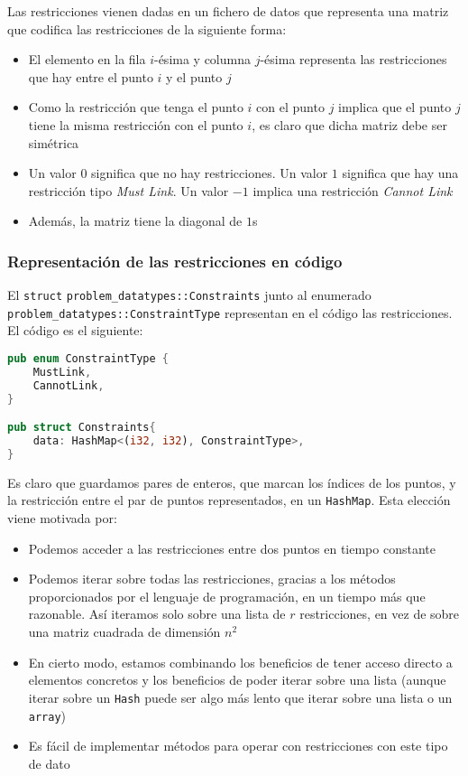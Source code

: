 \documentclass[11pt]{article}
\begin{document}
Las restricciones vienen dadas en un fichero de datos que representa una matriz que codifica las restricciones de la siguiente forma:

\begin{itemize}
    \item El elemento en la fila $i$-ésima y columna $j$-ésima representa las restricciones que hay entre el punto $i$ y el punto $j$
    \item Como la restricción que tenga el punto $i$ con el punto $j$ implica que el punto $j$ tiene la misma restricción con el punto $i$, es claro que dicha matriz debe ser simétrica
    \item Un valor $0$ significa que no hay restricciones. Un valor $1$ significa que hay una restricción tipo \emph{Must Link}. Un valor $-1$ implica una restricción \emph{Cannot Link}
    \item Además, la matriz tiene la diagonal de $1$s
\end{itemize}

\subsubsection{Representación de las restricciones en código}

El \lstinline{struct} \lstinline{problem_datatypes::Constraints} junto al enumerado \lstinline{problem_datatypes::ConstraintType} representan en el código las restricciones. El código es el siguiente:

\begin{lstlisting}[language=Rust, style=Boxed]
pub enum ConstraintType {
    MustLink,
    CannotLink,
}

pub struct Constraints{
    data: HashMap<(i32, i32), ConstraintType>,
}
\end{lstlisting}

Es claro que guardamos pares de enteros, que marcan los índices de los puntos, y la restricción entre el par de puntos representados, en un \lstinline{HashMap}. Esta elección viene motivada por:

\begin{itemize}
    \item Podemos acceder a las restricciones entre dos puntos en tiempo constante
    \item Podemos iterar sobre todas las restricciones, gracias a los métodos proporcionados por el lenguaje de programación, en un tiempo más que razonable. Así iteramos solo sobre una lista de $r$ restricciones, en vez de sobre una matriz cuadrada de dimensión $n^2$
    \item En cierto modo, estamos combinando los beneficios de tener acceso directo a elementos concretos y los beneficios de poder iterar sobre una lista (aunque iterar sobre un \lstinline{Hash} puede ser algo más lento que iterar sobre una lista o un \lstinline{array})
    \item Es fácil de implementar métodos para operar con restricciones con este tipo de dato
\end{itemize}
\end{document}
